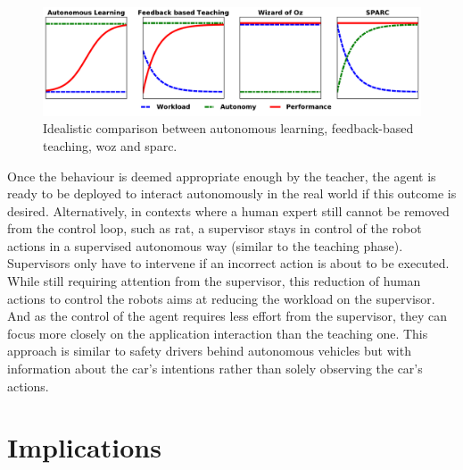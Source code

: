 \begin{figure}[ht]
	\includegraphics[width=1\linewidth]{concept.pdf}
	\centering
	\caption{Idealistic comparison between autonomous learning, feedback-based teaching, \gls{woz} and \gls{sparc}.}
	\label{fig:concept}
\end{figure}

Once the behaviour is deemed appropriate enough by the teacher, the agent is ready to be deployed to interact autonomously in the real world if this outcome is desired. Alternatively, in contexts where a human expert still cannot be removed from the control loop, such as \acrlong{rat}, a supervisor stays in control of the robot actions in a supervised autonomous way (similar to the teaching phase). Supervisors only have to intervene if an incorrect action is about to be executed. While still requiring attention from the supervisor, this reduction of human actions to control the robots aims at reducing the workload on the supervisor. And as the control of the agent requires less effort from the supervisor, they can focus more closely on the application interaction than the teaching one. This approach is similar to safety drivers behind autonomous vehicles but with information about the car's intentions rather than solely observing the car's actions. 

\section{Implications}

